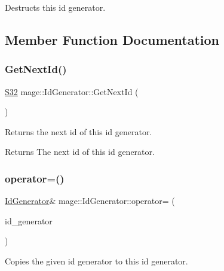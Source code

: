 Destructs this id generator. 

\subsection{Member Function Documentation}
\hypertarget{classmage_1_1_id_generator_a9e0e86e5feab919f5ac5ab4ad8f51b09}{}\label{classmage_1_1_id_generator_a9e0e86e5feab919f5ac5ab4ad8f51b09} 
\subsubsection{\texorpdfstring{Get\+Next\+Id()}{GetNextId()}}
{\footnotesize\ttfamily \hyperlink{namespacemage_a642e05c5c83642b6946703615cdbf2da}{S32} mage\+::\+Id\+Generator\+::\+Get\+Next\+Id (\begin{DoxyParamCaption}{ }\end{DoxyParamCaption})\hspace{0.3cm}{\ttfamily [noexcept]}}

Returns the next id of this id generator.

\begin{DoxyReturn}{Returns}
The next id of this id generator. 
\end{DoxyReturn}
\hypertarget{classmage_1_1_id_generator_a370c8289f38a534006e8b9ca7ec78026}{}\label{classmage_1_1_id_generator_a370c8289f38a534006e8b9ca7ec78026} 
\subsubsection{\texorpdfstring{operator=()}{operator=()}\hspace{0.1cm}{\footnotesize\ttfamily [1/2]}}
{\footnotesize\ttfamily \hyperlink{classmage_1_1_id_generator}{Id\+Generator}\& mage\+::\+Id\+Generator\+::operator= (\begin{DoxyParamCaption}\item[{const \hyperlink{classmage_1_1_id_generator}{Id\+Generator} \&}]{id\+\_\+generator }\end{DoxyParamCaption})\hspace{0.3cm}{\ttfamily [delete]}}

Copies the given id generator to this id generator.


